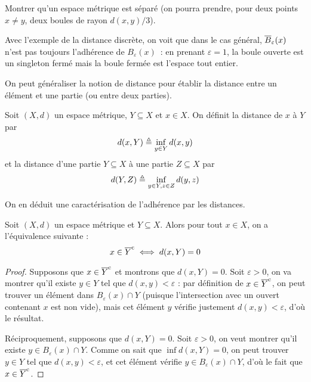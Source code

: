 \begin{exercise}
  Montrer qu'un espace métrique est séparé (on pourra prendre, pour deux points
  $x\neq y$, deux boules de rayon $d(x,y)/3$).
\end{exercise}

\begin{remark}
  Avec l'exemple de la distance discrète, on voit que dans le cas général,
  $\overline{B}_\varepsilon(x)$ n'est pas toujours l'adhérence de $B_\varepsilon(x)$~: en
  prenant $\varepsilon = 1$, la boule ouverte est un singleton fermé mais la
  boule fermée est l'espace tout entier.
\end{remark}

On peut généraliser la notion de distance pour établir la distance entre un
élément et une partie (ou entre deux parties).

\begin{definition}
  Soit $(X,d)$ un espace métrique, $Y\subseteq X$ et $x\in X$. On définit la
  distance de $x$ à $Y$ par
  \[d(x,Y)\triangleq \inf_{y\in Y} d(x,y)\]
  et la distance d'une partie $Y\subseteq X$ à une partie $Z\subseteq X$ par
  \[d(Y,Z)\triangleq \inf_{y\in Y, z \in Z} d(y,z)\]
\end{definition}

On en déduit une caractérisation de l'adhérence par les distances.

\begin{proposition}
  Soit $(X,d)$ un espace métrique et $Y\subseteq X$. Alors pour tout $x\in X$,
  on a l'équivalence suivante :
  \[x\in \overline{Y}^{\mathrm c} \iff d(x,Y) = 0\]
\end{proposition}

\begin{proof}
  Supposons que $x\in \overline{Y}^{\mathrm c}$ et montrons que $d(x,Y) = 0$. Soit
  $\varepsilon > 0$, on va montrer qu'il existe $y\in Y$ tel que
  $d(x,y)< \varepsilon$ : par définition de $x\in \overline{Y}^{\mathrm c}$, on peut trouver
  un élément dans $B_\varepsilon(x)\cap Y$ (puisque l'intersection avec un
  ouvert contenant $x$ est non vide), mais cet élément $y$ vérifie justement
  $d(x,y) < \varepsilon$, d'où le résultat.

  Réciproquement, supposons que $d(x,Y) = 0$. Soit $\varepsilon > 0$, on veut
  montrer qu'il existe $y\in B_\varepsilon(x)\cap Y$. Comme on sait que
  $\inf d(x,Y) = 0$, on peut trouver $y\in Y$ tel que $d(x,y) <\varepsilon$,
  et cet élément vérifie $y\in B_\varepsilon(x)\cap Y$, d'où le fait que
  $x\in \overline{Y}^{\mathrm c}$.
\end{proof}

